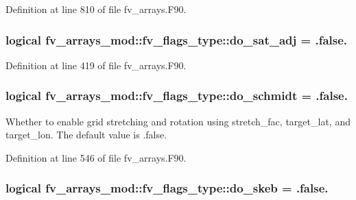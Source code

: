 Definition at line 810 of file fv\-\_\-arrays.\-F90.

\subsubsection[{do\-\_\-sat\-\_\-adj}]{\setlength{\rightskip}{0pt plus 5cm}logical fv\-\_\-arrays\-\_\-mod\-::fv\-\_\-flags\-\_\-type\-::do\-\_\-sat\-\_\-adj = .false.}\label{structfv__arrays__mod_1_1fv__flags__type_a600463f131f3b1df30dcf333938c7a39}


Definition at line 419 of file fv\-\_\-arrays.\-F90.

\subsubsection[{do\-\_\-schmidt}]{\setlength{\rightskip}{0pt plus 5cm}logical fv\-\_\-arrays\-\_\-mod\-::fv\-\_\-flags\-\_\-type\-::do\-\_\-schmidt = .false.}\label{structfv__arrays__mod_1_1fv__flags__type_a721802f882562799a4611c17ffb3ba0c}


Whether to enable grid stretching and rotation using stretch\-\_\-fac, target\-\_\-lat, and target\-\_\-lon. The default value is .false. 



Definition at line 546 of file fv\-\_\-arrays.\-F90.

\subsubsection[{do\-\_\-skeb}]{\setlength{\rightskip}{0pt plus 5cm}logical fv\-\_\-arrays\-\_\-mod\-::fv\-\_\-flags\-\_\-type\-::do\-\_\-skeb = .false.}\label{structfv__arrays__mod_1_1fv__flags__type_aa0cf5ca404f9d2be70ab5e49e0dc202c}


